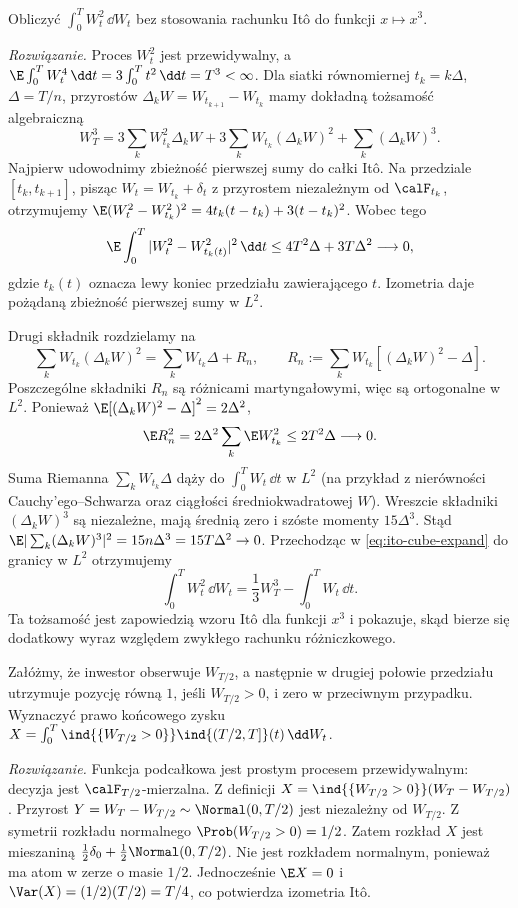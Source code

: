 \begin{zadanie}
Obliczyć $\int_0^T W_t^2\,\dd W_t$ bez stosowania
rachunku Itô do funkcji $x\mapsto x^3$.

\emph{Rozwiązanie.} Proces $W_t^2$ jest przewidywalny,
a $\E\int_0^T W_t^4\,\dd t
=3\int_0^T t^2\,\dd t=T^3<\infty$.
Dla siatki równomiernej $t_k=k\Delta$, $\Delta=T/n$,
przyrostów $\Delta_kW=W_{t_{k+1}}-W_{t_k}$ mamy
dokładną tożsamość algebraiczną
\[
W_T^3
=3\sum_kW_{t_k}^2\Delta_kW
+3\sum_kW_{t_k}(\Delta_kW)^2
+\sum_k(\Delta_kW)^3.
\tag{2.14}\label{eq:ito-cube-expand}
\]
Najpierw udowodnimy zbieżność pierwszej sumy do całki Itô.
Na przedziale $[t_k,t_{k+1}]$, pisząc
$W_t=W_{t_k}+\delta_t$ z przyrostem niezależnym od
$\calF_{t_k}$, otrzymujemy
$\E(W_t^2-W_{t_k}^2)^2
=4t_k(t-t_k)+3(t-t_k)^2$.
Wobec tego
\[
\E\int_0^T|W_t^2-W_{t_k(t)}^2|^2\,\dd t
\le 4T^2\Delta+3T\Delta^2\longrightarrow0,
\]
gdzie $t_k(t)$ oznacza lewy koniec przedziału
zawierającego $t$. Izometria daje pożądaną zbieżność
pierwszej sumy w $L^2$.

Drugi składnik rozdzielamy na
\[
\sum_kW_{t_k}(\Delta_kW)^2
=\sum_kW_{t_k}\Delta+R_n,\qquad
R_n:=\sum_kW_{t_k}[(\Delta_kW)^2-\Delta].
\]
Poszczególne składniki $R_n$ są różnicami
martyngałowymi, więc są ortogonalne w $L^2$. Ponieważ
$\E[(\Delta_kW)^2-\Delta]^2=2\Delta^2$,
\[
\E R_n^2
=2\Delta^2\sum_k\E W_{t_k}^2
\le2T^2\Delta\longrightarrow0.
\]
Suma Riemanna $\sum_kW_{t_k}\Delta$ dąży do
$\int_0^TW_t\,\dd t$ w $L^2$ (na przykład
z nierówności Cauchy'ego--Schwarza oraz ciągłości
średniokwadratowej $W$). Wreszcie składniki
$(\Delta_kW)^3$ są niezależne, mają średnią zero
i szóste momenty $15\Delta^3$. Stąd
$\E|\sum_k(\Delta_kW)^3|^2=15n\Delta^3=15T\Delta^2\to0$.
Przechodząc w \eqref{eq:ito-cube-expand} do granicy w $L^2$
otrzymujemy
\[
\int_0^TW_t^2\,\dd W_t
=\frac13W_T^3-\int_0^TW_t\,\dd t.
\tag{2.15}\label{eq:W2-dW}
\]
Ta tożsamość jest zapowiedzią wzoru Itô dla
funkcji $x^3$ i pokazuje, skąd bierze się dodatkowy
wyraz względem zwykłego rachunku różniczkowego.
\end{zadanie}

\begin{zadanie}
Załóżmy, że inwestor obserwuje $W_{T/2}$, a następnie
w drugiej połowie przedziału utrzymuje pozycję równą
$1$, jeśli $W_{T/2}>0$, i zero w przeciwnym przypadku.
Wyznaczyć prawo końcowego zysku
$X=\int_0^T\ind{\{W_{T/2}>0\}}\ind{(T/2,T]}(t)\,\dd W_t$.

\emph{Rozwiązanie.} Funkcja podcałkowa jest prostym
procesem przewidywalnym: decyzja jest
$\calF_{T/2}$-mierzalna. Z definicji
$X=\ind{\{W_{T/2}>0\}}(W_T-W_{T/2})$.
Przyrost $Y=W_T-W_{T/2}\sim\Normal(0,T/2)$ jest
niezależny od $W_{T/2}$. Z symetrii rozkładu normalnego
$\Prob(W_{T/2}>0)=1/2$. Zatem rozkład $X$ jest mieszaniną
$\frac12\delta_0+\frac12\Normal(0,T/2)$.
Nie jest rozkładem normalnym, ponieważ ma atom
w zerze o masie $1/2$. Jednocześnie
$\E X=0$ i $\Var(X)=(1/2)(T/2)=T/4$,
co potwierdza izometria Itô.
\end{zadanie}

